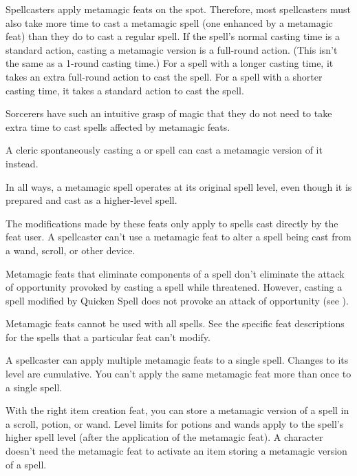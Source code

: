  Spellcasters apply metamagic feats on the spot. Therefore, most spellcasters must also take more time to cast a metamagic spell (one enhanced by a metamagic feat) than they do to cast a regular spell. If the spell's normal casting time is a standard action, casting a metamagic version is a full-round action. (This isn't the same as a 1-round casting time.) For a spell with a longer casting time, it takes an extra full-round action to cast the spell. For a spell with a shorter casting time, it takes a standard action to cast the spell.

\par Sorcerers have such an intuitive grasp of magic that they do not need to take extra time to cast spells affected by metamagic feats.

 A cleric spontaneously casting a  or  spell can cast a metamagic version of it instead.

 In all ways, a metamagic spell operates at its original spell level, even though it is prepared and cast as a higher-level spell.

The modifications made by these feats only apply to spells cast directly by the feat user. A spellcaster can't use a metamagic feat to alter a spell being cast from a wand, scroll, or other device.

Metamagic feats that eliminate components of a spell don't eliminate the attack of opportunity provoked by casting a spell while threatened. However, casting a spell modified by Quicken Spell does not provoke an attack of opportunity (see ).

Metamagic feats cannot be used with all spells. See the specific feat descriptions for the spells that a particular feat can't modify.

 A spellcaster can apply multiple metamagic feats to a single spell. Changes to its level are cumulative. You can't apply the same metamagic feat more than once to a single spell.

 With the right item creation feat, you can store a metamagic version of a spell in a scroll, potion, or wand. Level limits for potions and wands apply to the spell's higher spell level (after the application of the metamagic feat). A character doesn't need the metamagic feat to activate an item storing a metamagic version of a spell.

